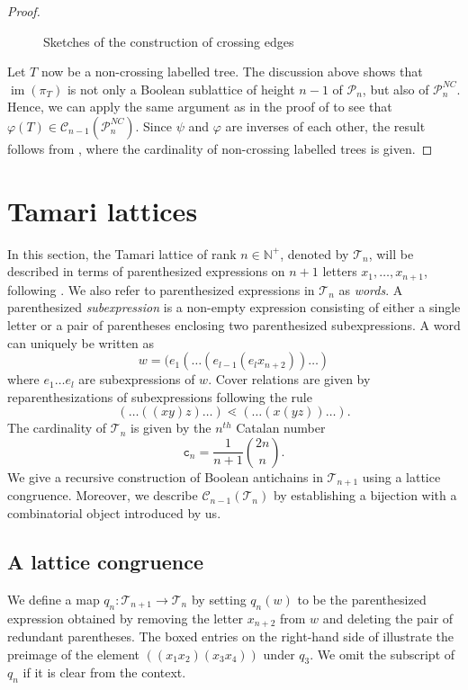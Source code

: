 \documentclass{preprint}
\newcommand{\im}{\operatorname{im}}
\newcommand{\cC}{\mathcal{C}}
\newcommand{\cP}{\mathcal{P}}
\newcommand{\cT}{\mathcal{T}}
\theoremstyle{definition}
\begin{document}
\begin{proof}
\begin{figure}
\begin{minipage}{0.3\textwidth}
    \end{minipage}
\caption{\centering Sketches of the construction of crossing edges}
\label{fig:Crossing Tree}
\end{figure}
\usetikzlibrary{patterns}

Let $T$ now be a non-crossing labelled tree. The discussion above shows that $\im(\pi_T)$ is not only a Boolean sublattice of height $n-1$ of $\cP_n$, but also of $\cP_n^{NC}$. Hence, we can apply the same argument as in the proof of  to see that $\varphi(T) \in  \cC_{n-1}(\cP_n^{NC})$.
Since $\psi$ and $\varphi$ are inverses of each other, the result follows from \cite{Noy1998Enumeration}, where the cardinality of non-crossing labelled trees is given.
\end{proof}


\section{Tamari lattices}\label{sec: Tamari lattices}
In this section, the Tamari lattice of rank $n\in \mathbb{N}^+$, denoted by $\cT_n$, will be described in terms of parenthesized expressions on $n+1$ letters $x_1, \dots, x_{n+1}$, following \cite{tamari}. We also refer to parenthesized expressions in $\cT_n$ as \emph{words}.
A parenthesized \emph{subexpression} is a non-empty expression consisting of either a single letter or a pair of parentheses enclosing two parenthesized subexpressions. A word can uniquely be written as \[w = (e_1(\dots (e_{l-1}(e_lx_{n+2}))\dots)\]where $e_1\dots e_l$ are subexpressions of $w$. 
Cover relations are given by reparenthesizations of subexpressions following the rule
\begin{equation}\label{eq:coverRel}
(\dots((xy)z)\dots) \lessdot (\dots (x(yz))\dots).
\end{equation}
The cardinality of $\cT_n$ is given by the $n^{th}$ Catalan number
\[
    \mathtt{c}_n = \frac{1}{n+1}\binom{2n}{n}.
\]
We give a recursive construction of Boolean antichains in $\cT_{n+1}$ using a lattice congruence. Moreover, we describe $\cC_{n-1}(\cT_n)$ by establishing a bijection with a combinatorial object introduced by us.

\subsection{A lattice congruence}\label{sec: lattice congruence}
We define a map $q_n : \cT_{n+1} \to \cT_{n}$ by setting $q_n(w)$ to be the parenthesized expression obtained by removing the letter $x_{n+2}$ from $w$ and deleting the pair of redundant parentheses. The boxed entries on the right-hand side of  illustrate the preimage of the element $((x_1x_2)(x_3x_4))$ under $q_3$. We omit the subscript of $q_n$ if it is clear from the context.
\end{document}
